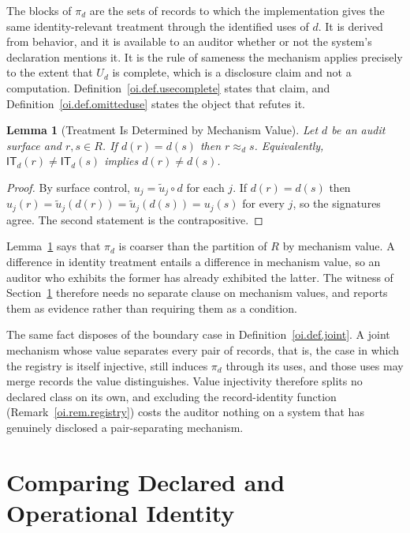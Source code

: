 \documentclass[11pt]{article}
\theoremstyle{plain}
\newtheorem{lemma}[theorem]{Lemma}
\theoremstyle{definition}
\theoremstyle{remark}
\newcommand{\IT}{\ensuremath{\mathsf{IT}}}
\newcommand{\Ker}{\ensuremath{\mathrel{\approx_{d}}}}
\begin{document}
The blocks of \(\pi_d\) are the sets of records
to which the implementation gives the same identity-relevant treatment
through the identified uses of \(d\).
It is derived from behavior,
and it is available to an auditor
whether or not the system's declaration mentions it.
It is the rule of sameness the mechanism applies
precisely to the extent that \(U_d\) is complete,
which is a disclosure claim and not a computation.
Definition~\ref{oi.def.usecomplete} states that claim,
and Definition~\ref{oi.def.omitteduse} states the object that refutes it.

\begin{lemma}[Treatment Is Determined by Mechanism Value]
  \label{oi.lem.determined}
  Let \(d\) be an audit surface and \(r,s\in R\).
  If \(d(r)=d(s)\) then \(r\Ker s\).
  Equivalently, \(\IT_d(r)\neq\IT_d(s)\) implies \(d(r)\neq d(s)\).
\end{lemma}

\begin{proof}
  By surface control, \(u_j=\tilde{u}_j\circ d\) for each \(j\).
  If \(d(r)=d(s)\) then
  \(u_j(r)=\tilde{u}_j(d(r))=\tilde{u}_j(d(s))=u_j(s)\)
  for every \(j\),
  so the signatures agree.
  The second statement is the contrapositive.
\end{proof}

Lemma~\ref{oi.lem.determined} says that \(\pi_d\) is coarser than
the partition of \(R\) by mechanism value.
A difference in identity treatment entails a difference in mechanism value,
so an auditor who exhibits the former has already exhibited the latter.
The witness of Section~\ref{oi.sec.compare}
therefore needs no separate clause on mechanism values,
and reports them as evidence rather than requiring them as a condition.

The same fact disposes of the boundary case in
Definition~\ref{oi.def.joint}.
A joint mechanism whose value separates every pair of records,
that is, the case in which the registry is itself injective,
still induces \(\pi_d\) through its uses,
and those uses may merge records the value distinguishes.
Value injectivity therefore splits no declared class on its own,
and excluding the record-identity function (Remark~\ref{oi.rem.registry})
costs the auditor nothing on a system
that has genuinely disclosed a pair-separating mechanism.

\section{Comparing Declared and Operational Identity}
\label{oi.sec.compare}
\end{document}
